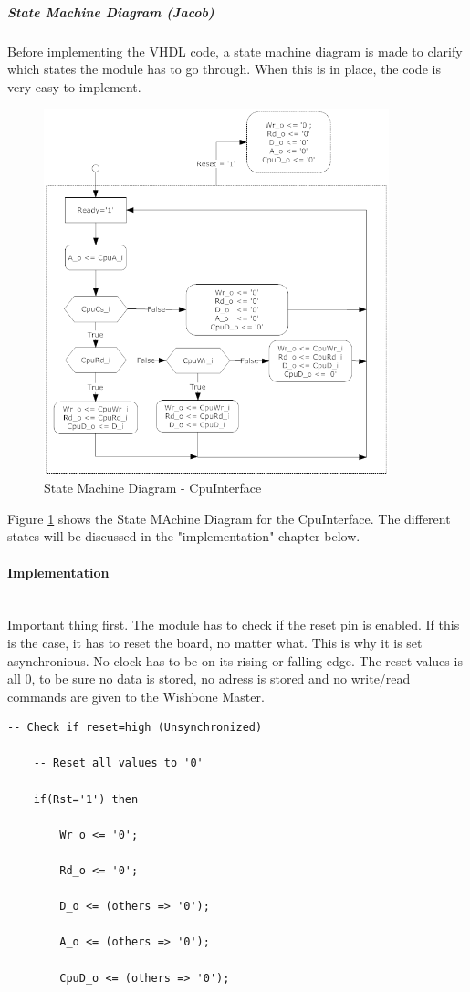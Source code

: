 \subparagraph{State Machine Diagram (Jacob)}
Before implementing the VHDL code, a state machine diagram is made to clarify which states the module has to go through. When this is in place, the code is very easy to implement.
\begin{figure}[H]
\centering
\includegraphics[width=10cm]{./img/State_Machine_Diagram_CpuInterface_v0_9}
\caption{State Machine Diagram - CpuInterface}
\label{fig:State_Machine_Diagram_CpuInterface_v0_9}
\end{figure}
Figure \ref{fig:State_Machine_Diagram_CpuInterface_v0_9} shows the State MAchine Diagram for the CpuInterface. The different states will be discussed in the "implementation" chapter below.

\paragraph{Implementation}\mbox{}\\
Important thing first. The module has to check if the reset pin is enabled. If this is the case, it has to reset the board, no matter what. This is why it is set asynchronious. No clock has to be on its rising or falling edge. The reset values is all 0, to be sure no data is stored, no adress is stored and no write/read commands are given to the Wishbone Master. 
\begin{verbatim}
-- Check if reset=high (Unsynchronized)

	-- Reset all values to '0'

	if(Rst='1') then

		Wr_o <= '0';

		Rd_o <= '0';

		D_o <= (others => '0');

		A_o <= (others => '0');

		CpuD_o <= (others => '0');
\end{verbatim}


